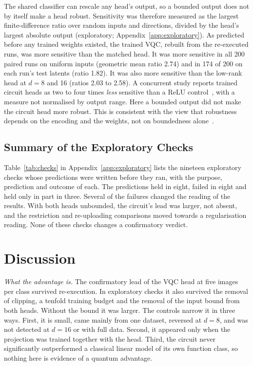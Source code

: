\documentclass{ieeeaccess}
\newcommand{\vqc}{VQC}
\begin{document}
The shared classifier can rescale any head's output, so a bounded output does not by itself make a head robust. Sensitivity was therefore measured as the largest finite-difference ratio over random inputs and directions, divided by the head's largest absolute output (exploratory; Appendix~\ref{app:exploratory}). As predicted before any trained weights existed, the trained \vqc{}, rebuilt from the re-executed runs, was more sensitive than the matched head. It was more sensitive in all 200 paired runs on uniform inputs (geometric mean ratio 2.74) and in 174 of 200 on each run's test latents (ratio 1.82). It was also more sensitive than the low-rank head at $d=8$ and 16 (ratios 2.03 to 2.58). A concurrent study reports trained circuit heads as two to four times \emph{less} sensitive than a ReLU control~\cite{epa2026}, with a measure not normalised by output range. Here a bounded output did not make the circuit head more robust. This is consistent with the view that robustness depends on the encoding and the weights, not on boundedness alone~\cite{berberich2024}.

\subsection{Summary of the Exploratory Checks}
\label{sec:checks}
Table~\ref{tab:checks} in Appendix~\ref{app:exploratory} lists the nineteen exploratory checks whose predictions were written before they ran, with the purpose, prediction and outcome of each. The predictions held in eight, failed in eight and held only in part in three. Several of the failures changed the reading of the results. With both heads unbounded, the circuit's lead was larger, not absent, and the restriction and re-uploading comparisons moved towards a regularisation reading. None of these checks changes a confirmatory verdict.

\section{Discussion}
\label{sec:discussion}
\emph{What the advantage is.} The confirmatory lead of the \vqc{} head at five images per class survived re-execution. In exploratory checks it also survived the removal of clipping, a tenfold training budget and the removal of the input bound from both heads. Without the bound it was larger. The controls narrow it in three ways. First, it is small, came mainly from one dataset, reversed at $d=8$, and was not detected at $d=16$ or with full data. Second, it appeared only when the projection was trained together with the head. Third, the circuit never significantly outperformed a classical linear model of its own function class, so nothing here is evidence of a quantum advantage.
\end{document}
